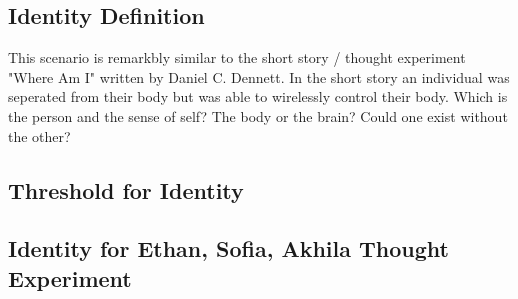 \documentclass[
	letterpaper, %
]{jdf}
\begin{document}

\subsection{Identity Definition}
This scenario is remarkbly similar to the short story / thought experiment "Where Am I" written by Daniel C. Dennett. In the short story an individual was seperated from their body but was able to wirelessly control their body. Which is the person and the sense of self? The body or the brain? Could one exist without the other?
\subsection{Threshold for Identity}
\subsection{Identity for Ethan, Sofia, Akhila Thought Experiment}

\end{document}

